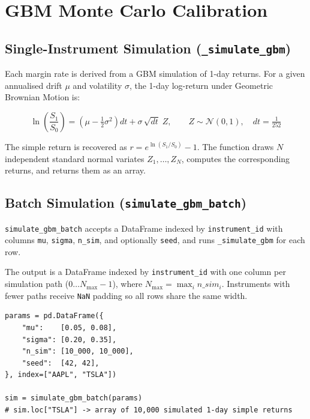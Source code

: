 \documentclass[9pt, a4paper]{extarticle}
\newenvironment{formulabox}{\par\addvspace{4pt}}{\par\addvspace{4pt}}
\begin{document}
\section{GBM Monte Carlo Calibration}
\label{sec:mc}

\subsection{Single-Instrument Simulation (\texttt{\_simulate\_gbm})}

Each margin rate is derived from a GBM simulation of 1-day returns. For a given
annualised drift $\mu$ and volatility $\sigma$, the 1-day log-return under
Geometric Brownian Motion is:

\begin{formulabox}
\[
    \ln\!\left(\frac{S_1}{S_0}\right) = \left(\mu - \tfrac{1}{2}\sigma^2\right) dt
    + \sigma\,\sqrt{dt}\;Z, \qquad Z \sim \mathcal{N}(0,1),\quad dt = \tfrac{1}{252}
\]
\end{formulabox}

The simple return is recovered as $r = e^{\ln(S_1/S_0)} - 1$.
The function draws $N$ independent standard normal variates $Z_1,\dots,Z_N$,
computes the corresponding returns, and returns them as an array.

\subsection{Batch Simulation (\texttt{simulate\_gbm\_batch})}

\texttt{simulate\_gbm\_batch} accepts a DataFrame indexed by \texttt{instrument\_id}
with columns \texttt{mu}, \texttt{sigma}, \texttt{n\_sim}, and optionally
\texttt{seed}, and runs \texttt{\_simulate\_gbm} for each row.

The output is a DataFrame indexed by \texttt{instrument\_id} with one column per
simulation path ($0 \ldots N_{\max}-1$), where $N_{\max} = \max_i n\_sim_i$.
Instruments with fewer paths receive \texttt{NaN} padding so all rows share the
same width.

\begin{lstlisting}
params = pd.DataFrame({
    "mu":    [0.05, 0.08],
    "sigma": [0.20, 0.35],
    "n_sim": [10_000, 10_000],
    "seed":  [42, 42],
}, index=["AAPL", "TSLA"])

sim = simulate_gbm_batch(params)
# sim.loc["TSLA"] -> array of 10,000 simulated 1-day simple returns
\end{lstlisting}
\end{document}
